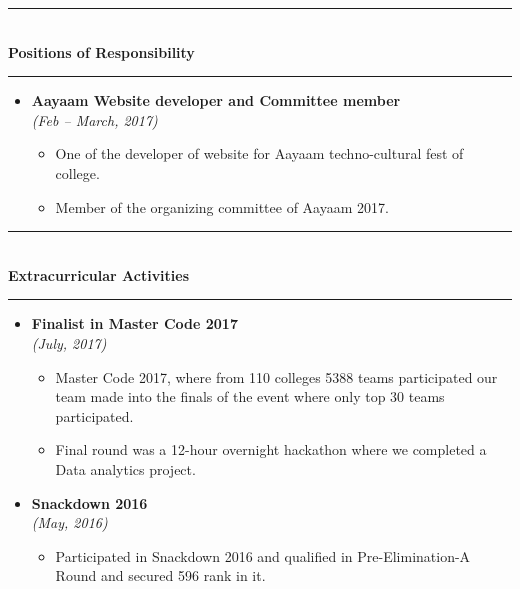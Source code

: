 \documentclass[a4paper,10pt]{article}
\newcommand{\isep}{-2 pt}
\begin{document}
\rule{1pt}{0pt} \\
\indent \textbf{Positions of Responsibility} \\[-0.2cm] \indent \rule{49em}{0.4pt}
\begin{itemize}
	\item \textbf{Aayaam Website developer and Committee member} \\
	\emph{(Feb – March,	2017)} \\[-0.6cm]
		\begin{itemize}\itemsep \isep
			\item One of the developer of website for Aayaam techno-cultural fest of college.
			\item Member of the organizing committee of Aayaam 2017.
		\end{itemize}
\end{itemize}

\rule{1pt}{0pt} \\
\indent \textbf{Extracurricular Activities} \\[-0.2cm] \indent \rule{49em}{0.4pt}
\begin{itemize}
	\item \textbf{Finalist in Master Code 2017} \\
	\emph{(July, 2017)} \\[-0.6cm]
		\begin{itemize}\itemsep \isep
			\item Master Code 2017, where from 110 colleges 5388 teams participated our team made into the finals of the event where only top 30 teams participated.
			\item Final round was a 12-hour overnight hackathon where we completed a Data analytics project.
		\end{itemize}
	\item \textbf{Snackdown 2016} \\
	\emph{(May, 2016)} \\[-0.6cm]
		\begin{itemize}\itemsep \isep
			\item Participated in Snackdown 2016 and qualified in Pre-Elimination-A Round and secured 596 rank in it.
		\end{itemize}
\end{itemize}
\end{document}
